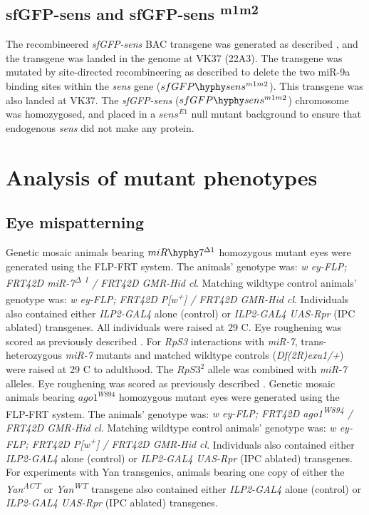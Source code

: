 \subsection{sfGFP-sens and sfGFP-sens \textsuperscript{m1m2}}

The recombineered \textit{sfGFP-sens} BAC transgene was generated as described \cite{Cassidy2013}, and the transgene was landed in the genome at VK37 (22A3). The transgene was mutated by site-directed recombineering as described \cite{Cassidy2013} to delete the two miR-9a binding sites within the \textit{sens} gene ($sfGFP\hyphy sens^{m1m2}$). This transgene was also landed at VK37. The \textit{sfGFP-sens} ($sfGFP\hyphy sens^{m1m2}$) chromosome was homozygosed, and placed in a $sens^{E1}$ null mutant background to ensure that endogenous \textit{sens} did not make any protein.

\section{Analysis of mutant phenotypes}
\label{appendix:metabolism:phenotypes}

\subsection{Eye mispatterning}

Genetic mosaic animals bearing $miR\hyphy 7^{\Delta 1}$ homozygous mutant eyes were generated using the FLP-FRT system. The animals' genotype was: \textit{w ey-FLP; FRT42D miR-7\textsuperscript{$\Delta$ 1} / FRT42D GMR-Hid cl}. Matching wildtype control animals' genotype was: \textit{w ey-FLP; FRT42D P{[}w\textsuperscript{+}{]} / FRT42D GMR-Hid cl}. Individuals also contained either \textit{ILP2-GAL4} alone (control) or \textit{ILP2-GAL4 UAS-Rpr} (IPC ablated) transgenes. All individuals were raised at 29 \textdegree{}C. Eye roughening was scored as previously described \cite{Li2009b}. For \textit{RpS3} interactions with \textit{miR-7}, trans-heterozygous \textit{miR-7} mutants and matched wildtype controls (\textit{Df(2R)exu1/+}) were raised at 29 \textdegree{}C to adulthood. The $RpS3^2$ allele was combined with \textit{miR-7} alleles. Eye roughening was scored as previously described \cite{Li2009b}. Genetic mosaic animals bearing $ago1^{W894}$ homozygous mutant eyes were generated using the FLP-FRT system. The animals' genotype was: \textit{w ey-FLP; FRT42D ago1\textsuperscript{W894} / FRT42D GMR-Hid cl}. Matching wildtype control animals' genotype was: \textit{w ey-FLP; FRT42D P{[}w\textsuperscript{+}{]} / FRT42D GMR-Hid cl}. Individuals also contained either \textit{ILP2-GAL4} alone (control) or \textit{ILP2-GAL4 UAS-Rpr} (IPC ablated) transgenes. For experiments with Yan transgenics, animals bearing one copy of either the \textit{Yan\textsuperscript{ACT}} or \textit{Yan\textsuperscript{WT}} \cite{Rebay1995} transgene also contained either \textit{ILP2-GAL4} alone (control) or \textit{ILP2-GAL4 UAS-Rpr} (IPC ablated) transgenes.

